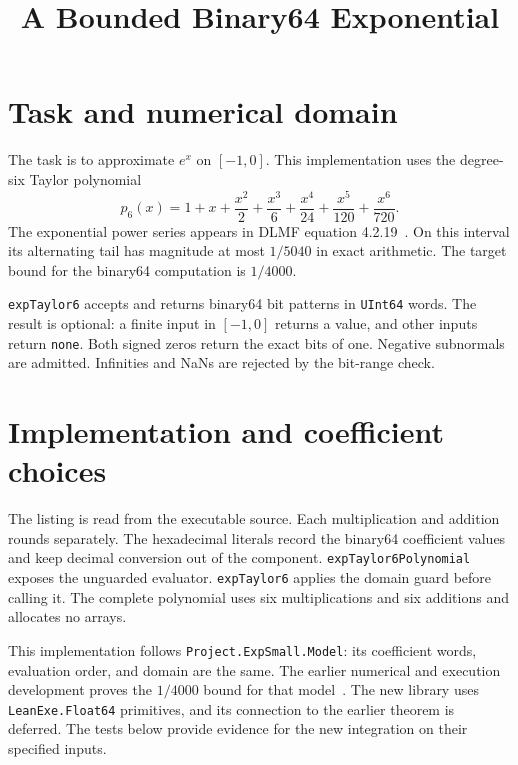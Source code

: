 
\title{A Bounded Binary64 Exponential}

\maketitle

\section{Task and numerical domain}
The task is to approximate $e^x$ on $[-1,0]$.  This implementation uses
the degree-six Taylor polynomial
\[
  p_6(x)=1+x+\frac{x^2}{2}+\frac{x^3}{6}
         +\frac{x^4}{24}+\frac{x^5}{120}+\frac{x^6}{720}.
\]
The exponential power series appears in DLMF equation 4.2.19~\cite{series}.
On this interval its alternating tail has magnitude at most $1/5040$ in exact
arithmetic.  The target bound for the binary64 computation is $1/4000$.

\texttt{expTaylor6} accepts and returns binary64 bit patterns in
\texttt{UInt64} words.  The result is optional: a finite input in $[-1,0]$
returns a value, and other inputs return \texttt{none}.  Both signed zeros
return the exact bits of one.  Negative subnormals are admitted.  Infinities
and NaNs are rejected by the bit-range check.

\section{Implementation and coefficient choices}


The listing is read from the executable source.  Each multiplication and
addition rounds separately.  The hexadecimal literals record the binary64
coefficient values and keep decimal conversion out of the component.
\texttt{expTaylor6Polynomial} exposes the unguarded evaluator.
\texttt{expTaylor6} applies the domain guard before calling it.
The complete polynomial uses six multiplications and six additions and
allocates no arrays.

This implementation follows \texttt{Project.ExpSmall.Model}: its coefficient
words, evaluation order, and domain are the same.  The earlier numerical
and execution development proves the $1/4000$ bound for that model~\cite{prior}.
The new library uses \texttt{LeanExe.Float64} primitives, and its connection
to the earlier theorem is deferred.  The tests below provide evidence for
the new integration on their specified inputs.

